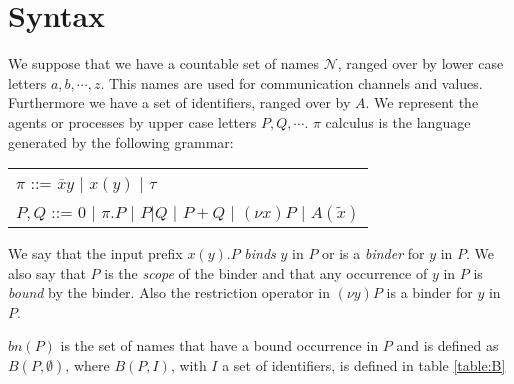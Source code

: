 
\section{Syntax}

We suppose that we have a countable set of names $\mathcal{N}$, ranged over by lower case letters $a,b, \cdots, z$. This names are used for communication channels and values. Furthermore we have a set of identifiers, ranged over by $A$. We represent the agents or processes by upper case letters $P,Q, \cdots $. 
$\pi$ calculus is the language generated by the following grammar:
\begin{center}
  \begin{tabular}{l}
      $\pi$ ::= $\overline{x}y$ | $x(y)$ | $\tau$ 
    \\
      $P,Q$ ::= $0$ | $\pi.P$ | $P|Q$ | $P+Q$ | $(\nu x) P$ | $A(\tilde{x})$ 
  \end{tabular}
\end{center}

\begin{definition}
  We say that the input prefix $x(y).P$ \emph{binds} $y$ in $P$ or is a \emph{binder} for $y$ in $P$. We also say that $P$ is the \emph{scope} of the binder and that any occurrence of $y$ in $P$ is \emph{bound} by the binder. Also the restriction operator in $(\nu y)P$ is a binder for $y$ in $P$. 
\end{definition}

\begin{definition}
  $bn(P)$ is the set of names that have a bound occurrence in $P$ and is defined as $B(P, \emptyset)$, where $B(P, I)$, with $I$ a set of identifiers, is defined in table \ref{table:B}
\end{definition}

